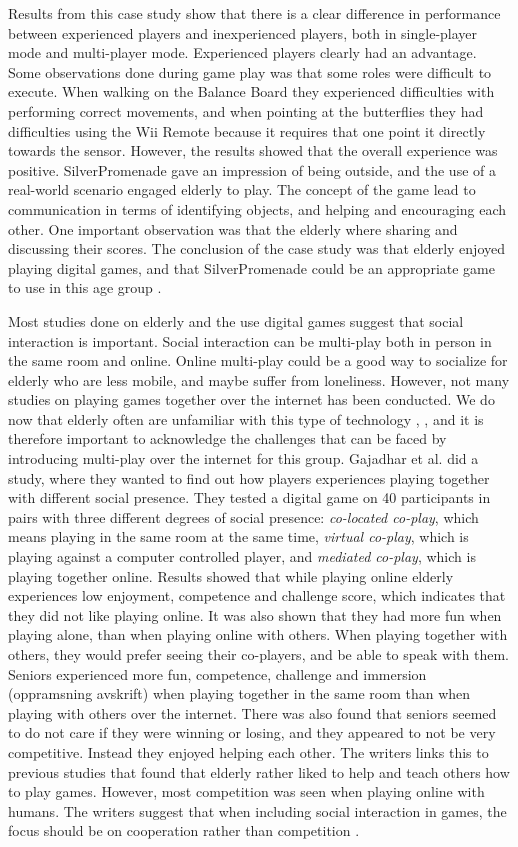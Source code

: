 Results from this case study show that there is a clear difference in performance between experienced players and inexperienced players, both in single-player mode and multi-player mode. Experienced players clearly had an advantage. Some observations done during game play was that some roles were difficult to execute. When walking on the Balance Board they experienced difficulties with performing correct movements, and when pointing at the butterflies they had difficulties using the Wii Remote because it requires that one point it directly towards the sensor. However, the results showed that the overall experience was positive. SilverPromenade gave an impression of being outside, and the use of a real-world scenario engaged elderly to play. The concept of the game lead to communication in terms of identifying objects, and helping and encouraging each other. One important observation was that the elderly where sharing and discussing their scores. The conclusion of the case study was that elderly enjoyed playing digital games, and that SilverPromenade could be an appropriate game to use in this age group \cite{gerling2}.

Most studies done on elderly and the use digital games suggest that social interaction is important. Social interaction can be multi-play both in person in the same room and online. Online multi-play could be a good way to socialize for elderly who are less mobile, and maybe suffer from loneliness. However, not many studies on playing games together over the internet has been conducted. We do now that elderly often are unfamiliar with this type of technology \cite{Billis}, \cite{gregor}, and it is therefore important to acknowledge the challenges that can be faced by introducing multi-play over the internet for this group. Gajadhar et al. \cite{Gajadhar} did a study, where they wanted to find out how players experiences playing together with different social presence. They tested a digital game on 40 participants in pairs with three different degrees of social presence: \emph{co-located co-play}, which means playing in the same room at the same time, \emph{virtual co-play}, which is playing against a computer controlled player, and \emph{mediated co-play}, which is playing together online. Results showed that while playing online elderly experiences low enjoyment, competence and challenge score, which indicates that they did not like playing online. It was also shown that they had more fun when playing alone, than when playing online with others. When playing together with others, they would prefer seeing their co-players, and be able to speak with them. Seniors experienced more fun, competence, challenge and immersion (oppramsning avskrift) when playing together in the same room than when playing with others over the internet. There was also found that seniors seemed to do not care if they were winning or losing, and they appeared to not be very competitive.  Instead they enjoyed helping each other. The writers links this to previous studies that found that elderly rather liked to help and teach others how to play games. However, most competition was seen when playing online with humans. The writers suggest that when including social interaction in games, the focus should be on cooperation rather than competition \cite{Gajadhar}. 


